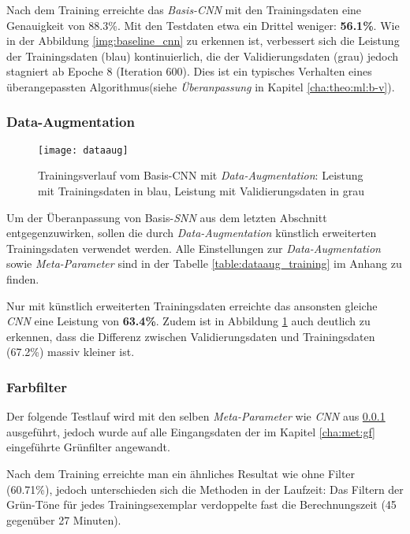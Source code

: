Nach dem Training erreichte das \textit{Basis-CNN} mit den Trainingsdaten eine Genauigkeit von 88.3\%. Mit den Testdaten etwa ein Drittel weniger: \textbf{56.1\%}. Wie in der Abbildung \ref{img:baseline_cnn} zu erkennen ist, verbessert sich die Leistung der Trainingsdaten (blau) kontinuierlich, die der Validierungsdaten (grau) jedoch stagniert ab Epoche 8 (Iteration 600). Dies ist ein typisches Verhalten eines überangepassten Algorithmus(siehe \textit{Überanpassung} in Kapitel \ref{cha:theo:ml:b-v}).


\subsubsection{Data-Augmentation} \label{cha:met:da}

\begin{figure}[]
	\centering
	\texttt{[image: dataaug]}
	\caption[Trainingsverlauf Basis-\textit{CNN} mit \textit{Data-Augmentation}]{Trainingsverlauf vom Basis-{CNN} mit \textit{Data-Augmentation}: Leistung mit Trainingsdaten in blau, Leistung mit Validierungsdaten in grau}
	\label{img:dataaug_cnn}
\end{figure}

Um der Überanpassung von Basis-\textit{SNN} aus dem letzten Abschnitt entgegenzuwirken, sollen die durch \textit{Data-Augmentation} künstlich erweiterten Trainingsdaten verwendet werden. Alle Einstellungen zur \textit{Data-Augmentation} sowie \textit{Meta-Parameter} sind in der Tabelle \ref{table:dataaug_training} im Anhang zu finden.

Nur mit künstlich erweiterten Trainingsdaten erreichte das ansonsten gleiche \textit{CNN} eine Leistung von \textbf{63.4\%}. Zudem ist in Abbildung \ref{img:dataaug_cnn} auch deutlich zu erkennen, dass die Differenz zwischen Validierungsdaten und Trainingsdaten (67.2\%) massiv kleiner ist.

\subsubsection{Farbfilter}
Der folgende Testlauf wird mit den selben \textit{Meta-Parameter} wie \textit{CNN} aus \ref{cha:met:da} ausgeführt, jedoch wurde auf alle Eingangsdaten der im Kapitel \ref{cha:met:gf} eingeführte Grünfilter angewandt.

Nach dem Training  erreichte man ein ähnliches Resultat wie ohne Filter (60.71\%), jedoch unterschieden sich die Methoden in der Laufzeit: Das Filtern der Grün-Töne für jedes Trainingsexemplar verdoppelte fast die Berechnungszeit (45 gegenüber 27 Minuten).

